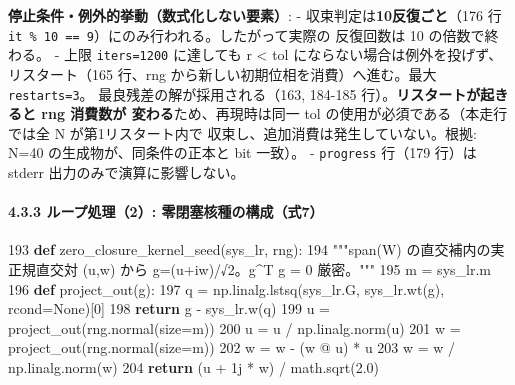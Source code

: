 \documentclass[
  a4paper,
]{ltjsarticle}
\newenvironment{Shaded}{}{}
\newcommand{\ControlFlowTok}[1]{\textcolor[rgb]{0.00,0.44,0.13}{\textbf{#1}}}
\newcommand{\DecValTok}[1]{\textcolor[rgb]{0.25,0.63,0.44}{#1}}
\newcommand{\FloatTok}[1]{\textcolor[rgb]{0.25,0.63,0.44}{#1}}
\newcommand{\KeywordTok}[1]{\textcolor[rgb]{0.00,0.44,0.13}{\textbf{#1}}}
\newcommand{\NormalTok}[1]{#1}
\newcommand{\OperatorTok}[1]{\textcolor[rgb]{0.40,0.40,0.40}{#1}}
\newcommand{\OtherTok}[1]{\textcolor[rgb]{0.00,0.44,0.13}{#1}}
\newcommand{\StringTok}[1]{\textcolor[rgb]{0.25,0.44,0.63}{#1}}
\newcommand{\VariableTok}[1]{\textcolor[rgb]{0.10,0.09,0.49}{#1}}
\begin{document}
\textbf{停止条件・例外的挙動（数式化しない要素）}: -
収束判定は\textbf{10反復ごと}（176 行
\texttt{it\ \%\ 10\ ==\ 9}）にのみ行われる。したがって実際の 反復回数は
10 の倍数で終わる。 - 上限 \texttt{iters=1200} に達しても r \textless{}
tol にならない場合は例外を投げず、 リスタート（165 行、rng
から新しい初期位相を消費）へ進む。最大 \texttt{restarts=3}。
最良残差の解が採用される（163, 184-185
行）。\textbf{リスタートが起きると rng 消費数が
変わる}ため、再現時は同一 tol の使用が必須である（本走行では全 N
が第1リスタート内で 収束し、追加消費は発生していない。根拠: N=40
の生成物が、同条件の正本と bit 一致）。 - \texttt{progress} 行（179
行）は stderr 出力のみで演算に影響しない。

\paragraph{4.3.3 ループ処理（2）:
零閉塞核種の構成（式7）}\label{ux30ebux30fcux30d7ux51e6ux74062-ux96f6ux9589ux585eux6838ux7a2eux306eux69cbux6210ux5f0f7}

\begin{Shaded}
\begin{Highlighting}[]
   \DecValTok{193}  \KeywordTok{def}\NormalTok{ zero\_closure\_kernel\_seed(sys\_lr, rng):}
   \DecValTok{194}      \StringTok{"""span(W) の直交補内の実正規直交対 (u,w) から g=(u+iw)/√2。g\^{}T g = 0 厳密。"""}
   \DecValTok{195}\NormalTok{      m }\OperatorTok{=}\NormalTok{ sys\_lr.m}
   \DecValTok{196}      \KeywordTok{def}\NormalTok{ project\_out(g):}
   \DecValTok{197}\NormalTok{          q }\OperatorTok{=}\NormalTok{ np.linalg.lstsq(sys\_lr.G, sys\_lr.wt(g), rcond}\OperatorTok{=}\VariableTok{None}\NormalTok{)[}\DecValTok{0}\NormalTok{]}
   \DecValTok{198}          \ControlFlowTok{return}\NormalTok{ g }\OperatorTok{{-}}\NormalTok{ sys\_lr.w(q)}
   \DecValTok{199}\NormalTok{      u }\OperatorTok{=}\NormalTok{ project\_out(rng.normal(size}\OperatorTok{=}\NormalTok{m))}
   \DecValTok{200}\NormalTok{      u }\OperatorTok{=}\NormalTok{ u }\OperatorTok{/}\NormalTok{ np.linalg.norm(u)}
   \DecValTok{201}\NormalTok{      w }\OperatorTok{=}\NormalTok{ project\_out(rng.normal(size}\OperatorTok{=}\NormalTok{m))}
   \DecValTok{202}\NormalTok{      w }\OperatorTok{=}\NormalTok{ w }\OperatorTok{{-}}\NormalTok{ (w }\OperatorTok{@}\NormalTok{ u) }\OperatorTok{*}\NormalTok{ u}
   \DecValTok{203}\NormalTok{      w }\OperatorTok{=}\NormalTok{ w }\OperatorTok{/}\NormalTok{ np.linalg.norm(w)}
   \DecValTok{204}      \ControlFlowTok{return}\NormalTok{ (u }\OperatorTok{+} \OtherTok{1j} \OperatorTok{*}\NormalTok{ w) }\OperatorTok{/}\NormalTok{ math.sqrt(}\FloatTok{2.0}\NormalTok{)}
\end{Highlighting}
\end{Shaded}
\end{document}
